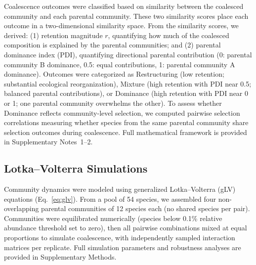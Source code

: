 Coalescence outcomes were classified based on similarity between the coalesced community and each parental community.  These two similarity scores place each outcome in a two-dimensional similarity space. From the similarity scores, we derived: (1) retention magnitude $r$, quantifying how much of the coalesced composition is explained by the parental communities; and (2) parental dominance index (PDI), quantifying directional parental contribution (0: parental community B dominance, 0.5: equal contributions, 1: parental community A dominance).  Outcomes were categorized as Restructuring (low retention; substantial ecological reorganization), Mixture (high retention with PDI near 0.5; balanced parental contributions), or Dominance (high retention with PDI near 0 or 1; one parental community overwhelms the other). To assess whether Dominance reflects community-level selection, we computed pairwise selection correlations measuring whether species from the same parental community share selection outcomes during coalescence. Full mathematical framework is provided in Supplementary Notes~1--2.


\subsection*{Lotka--Volterra Simulations}
\label{sec:methods:simulations}

Community dynamics were modeled using generalized Lotka--Volterra (gLV) equations (Eq.~\ref{eq:glv}).  From a pool of 54 species, we assembled four non-overlapping parental communities of 12 species each (no shared species per pair). Communities were equilibrated numerically (species below 0.1\% relative abundance threshold set to zero), then all pairwise combinations mixed at equal proportions to simulate coalescence, with independently sampled interaction matrices per replicate. Full simulation parameters and robustness analyses are provided in Supplementary Methods.


